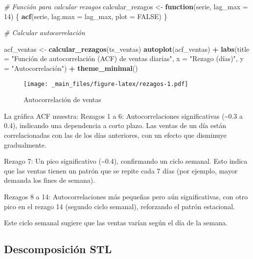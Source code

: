 \documentclass[
]{book}
\newenvironment{Shaded}{\begin{snugshade}}{\end{snugshade}}
\newcommand{\AttributeTok}[1]{\textcolor[rgb]{0.13,0.29,0.53}{#1}}
\newcommand{\CommentTok}[1]{\textcolor[rgb]{0.56,0.35,0.01}{\textit{#1}}}
\newcommand{\ConstantTok}[1]{\textcolor[rgb]{0.56,0.35,0.01}{#1}}
\newcommand{\ControlFlowTok}[1]{\textcolor[rgb]{0.13,0.29,0.53}{\textbf{#1}}}
\newcommand{\DecValTok}[1]{\textcolor[rgb]{0.00,0.00,0.81}{#1}}
\newcommand{\FunctionTok}[1]{\textcolor[rgb]{0.13,0.29,0.53}{\textbf{#1}}}
\newcommand{\NormalTok}[1]{#1}
\newcommand{\OtherTok}[1]{\textcolor[rgb]{0.56,0.35,0.01}{#1}}
\newcommand{\SpecialCharTok}[1]{\textcolor[rgb]{0.81,0.36,0.00}{\textbf{#1}}}
\newcommand{\StringTok}[1]{\textcolor[rgb]{0.31,0.60,0.02}{#1}}
\begin{document}
\begin{Shaded}
\begin{Highlighting}[]
\CommentTok{\# Función para calcular rezagos}
\NormalTok{calcular\_rezagos }\OtherTok{\textless{}{-}} \ControlFlowTok{function}\NormalTok{(serie, }\AttributeTok{lag\_max =} \DecValTok{14}\NormalTok{) \{}
  \FunctionTok{acf}\NormalTok{(serie, }\AttributeTok{lag.max =}\NormalTok{ lag\_max, }\AttributeTok{plot =} \ConstantTok{FALSE}\NormalTok{)}
\NormalTok{\}}

\CommentTok{\# Calcular autocorrelación}

\NormalTok{acf\_ventas }\OtherTok{\textless{}{-}} \FunctionTok{calcular\_rezagos}\NormalTok{(ts\_ventas)}
\FunctionTok{autoplot}\NormalTok{(acf\_ventas) }\SpecialCharTok{+}
  \FunctionTok{labs}\NormalTok{(}\AttributeTok{title =} \StringTok{"Función de autocorrelación (ACF) de ventas diarias"}\NormalTok{,}
       \AttributeTok{x =} \StringTok{"Rezago (días)"}\NormalTok{, }\AttributeTok{y =} \StringTok{"Autocorrelación"}\NormalTok{) }\SpecialCharTok{+}
  \FunctionTok{theme\_minimal}\NormalTok{()}
\end{Highlighting}
\end{Shaded}

\begin{figure}
\centering
\texttt{[image: \_main\_files/figure-latex/rezagos-1.pdf]}
\caption{\label{fig:rezagos}Autocorrelación de ventas}
\end{figure}

La gráfica ACF muestra:
Rezagos 1 a 6: Autocorrelaciones significativas (\textasciitilde0.3 a 0.4), indicando una dependencia a corto plazo. Las ventas de un día están correlacionadas con las de los días anteriores, con un efecto que disminuye gradualmente.

Rezago 7: Un pico significativo (\textasciitilde0.4), confirmando un ciclo semanal. Esto indica que las ventas tienen un patrón que se repite cada 7 días (por ejemplo, mayor demanda los fines de semana).

Rezagos 8 a 14: Autocorrelaciones más pequeñas pero aún significativas, con otro pico en el rezago 14 (segundo ciclo semanal), reforzando el patrón estacional.

Este ciclo semanal sugiere que las ventas varían según el día de la semana.

\subsection{Descomposición STL}\label{descomposiciuxf3n-stl}
\end{document}
